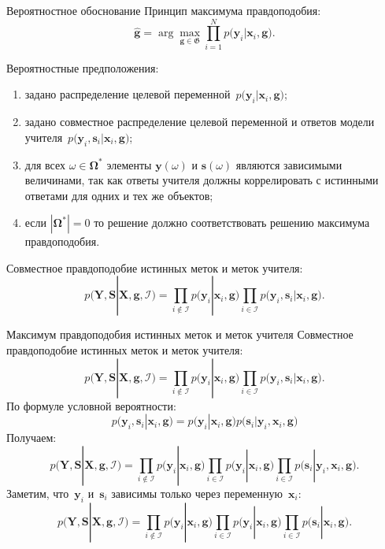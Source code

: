 \documentclass[9pt,pdf,hyperref={unicode}]{beamer}
\begin{document}
\begin{frame}{Вероятностное обоснование}
\justifying
Принцип максимума правдоподобия:
\[
\hat{\mathbf{g}} = \arg\max_{\mathbf{g}\in \mathfrak{G}} \prod_{i=1}^{N}p\bigr(\mathbf{y}_{i}|\mathbf{x}_i, \mathbf{g}\bigr).
\]

Вероятностные предположения:
\begin{enumerate}
	\item задано распределение целевой переменной~$p\bigr(\mathbf{y}_i|\mathbf{x}_i, \mathbf{g}\bigr)$;
	\item задано совместное распределение целевой переменной и ответов модели учителя~$p\bigr(\mathbf{y}_i, \mathbf{s}_i|\mathbf{x}_i, \mathbf{g}\bigr)$;
	\item для всех $\omega \in \bm{\Omega}^*$ элементы $\mathbf{y}(\omega)$ и $\mathbf{s}(\omega)$ являются зависимыми величинами, так как ответы учителя должны коррелировать с истинными ответами для одних и тех же объектов;
	\item если $|\bm{\Omega}^*|=0$ то решение должно соответствовать решению максимума правдоподобия.
\end{enumerate}
Совместное правдоподобие истинных меток и меток учителя:
\[
p\bigr(\mathbf{Y}, \mathbf{S}|\mathbf{X}, \mathbf{g}, \mathcal{I}\bigr)=\prod_{i\not\in \mathcal{I}}p\bigr(\mathbf{y}_i|\mathbf{x}_i, \mathbf{g}\bigr)\prod_{i\in \mathcal{I}}p\bigr(\mathbf{y}_i, \mathbf{s}_i|\mathbf{x}_i, \mathbf{g}\bigr).
\]
\end{frame}
\begin{frame}{Максимум правдоподобия истинных меток и меток учителя}
\justifying
Совместное правдоподобие истинных меток и меток учителя:
\[
p\bigr(\mathbf{Y}, \mathbf{S}|\mathbf{X}, \mathbf{g}, \mathcal{I}\bigr)=\prod_{i\not\in \mathcal{I}}p\bigr(\mathbf{y}_i|\mathbf{x}_i, \mathbf{g}\bigr)\prod_{i\in \mathcal{I}}p\bigr(\mathbf{y}_i, \mathbf{s}_i|\mathbf{x}_i, \mathbf{g}\bigr).
\]
По формуле условной вероятности:
\[
p\bigr(\mathbf{y}_i, \mathbf{s}_i|\mathbf{x}_i, \mathbf{g}\bigr) = p\bigr(\mathbf{y}_i|\mathbf{x}_i, \mathbf{g}\bigr)p\bigr(\mathbf{s}_i|\mathbf{y}_i, \mathbf{x}_i, \mathbf{g}\bigr)
\]
Получаем:
\[
p\bigr(\mathbf{Y}, \mathbf{S}|\mathbf{X}, \mathbf{g}, \mathcal{I}\bigr)=\prod_{i\not\in \mathcal{I}}p\bigr(\mathbf{y}_i|\mathbf{x}_i, \mathbf{g}\bigr)\prod_{i\in \mathcal{I}}p\bigr(\mathbf{y}_i|\mathbf{x}_i, \mathbf{g}\bigr)\prod_{i\in \mathcal{I}}p\bigr(\mathbf{s}_i|\mathbf{y}_i, \mathbf{x}_i, \mathbf{g}\bigr).
\]
Заметим, что~$\mathbf{y}_i$ и~$\mathbf{s}_i$ зависимы только через переменную~$\mathbf{x}_i$:
\[
p\bigr(\mathbf{Y}, \mathbf{S}|\mathbf{X}, \mathbf{g}, \mathcal{I}\bigr)=\prod_{i\not\in \mathcal{I}}p\bigr(\mathbf{y}_i|\mathbf{x}_i, \mathbf{g}\bigr)\prod_{i\in \mathcal{I}}p\bigr(\mathbf{y}_i|\mathbf{x}_i, \mathbf{g}\bigr)\prod_{i\in \mathcal{I}}p\bigr(\mathbf{s}_i|\mathbf{x}_i, \mathbf{g}\bigr).
\]

\end{frame}
\end{document}

